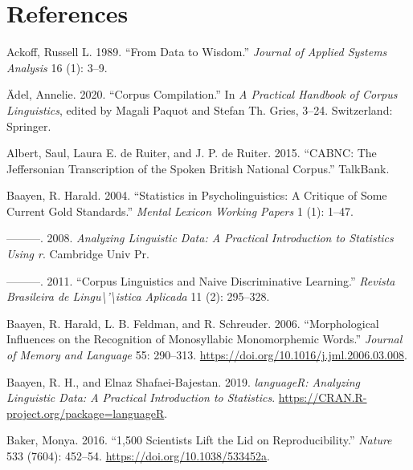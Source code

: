 \documentclass[
  letterpaper,
]{latex/krantz}
\newlength{\cslhangindent}
\newenvironment{CSLReferences}[2] %
 {\begin{list}{}{%
  \setlength{\itemindent}{0pt}
  \setlength{\leftmargin}{0pt}
  \setlength{\parsep}{0pt}
  \ifodd #1
   \setlength{\leftmargin}{\cslhangindent}
   \setlength{\itemindent}{-1\cslhangindent}
  \fi
  \setlength{\itemsep}{#2\baselineskip}}}
 {\end{list}}
\theoremstyle{definition}
\theoremstyle{remark}
\begin{document}

\chapter*{References}\label{references}


\label{refs}
\begin{CSLReferences}{1}{0}
Ackoff, Russell L. 1989. {``From Data to Wisdom.''} \emph{Journal of
Applied Systems Analysis} 16 (1): 3--9.

Ädel, Annelie. 2020. {``Corpus Compilation.''} In \emph{A Practical
Handbook of Corpus Linguistics}, edited by Magali Paquot and Stefan Th.
Gries, 3--24. Switzerland: Springer.

Albert, Saul, Laura E. de Ruiter, and J. P. de Ruiter. 2015. {``CABNC:
The Jeffersonian Transcription of the Spoken British National Corpus.''}
TalkBank.

Baayen, R. Harald. 2004. {``Statistics in Psycholinguistics: A Critique
of Some Current Gold Standards.''} \emph{Mental Lexicon Working Papers}
1 (1): 1--47.

---------. 2008. \emph{Analyzing Linguistic Data: A Practical
Introduction to Statistics Using r}. Cambridge Univ Pr.

---------. 2011. {``Corpus Linguistics and Naive Discriminative
Learning.''} \emph{Revista Brasileira de
Lingu{\textbackslash{}}'{\textbackslash{}}istica Aplicada} 11 (2):
295--328.

Baayen, R. Harald, L. B. Feldman, and R. Schreuder. 2006.
{``Morphological Influences on the Recognition of Monosyllabic
Monomorphemic Words.''} \emph{Journal of Memory and Language} 55:
290--313. \url{https://doi.org/10.1016/j.jml.2006.03.008}.

Baayen, R. H., and Elnaz Shafaei-Bajestan. 2019. \emph{languageR:
Analyzing Linguistic Data: A Practical Introduction to Statistics}.
\url{https://CRAN.R-project.org/package=languageR}.

Baker, Monya. 2016. {``1,500 Scientists Lift the Lid on
Reproducibility.''} \emph{Nature} 533 (7604): 452--54.
\url{https://doi.org/10.1038/533452a}.


\end{CSLReferences}
\end{document}
